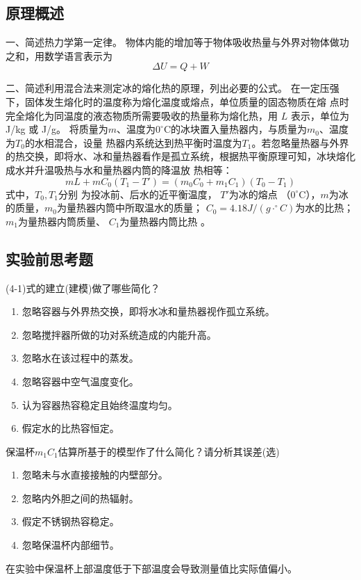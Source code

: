 \documentclass[dvipsnames, svgnames,a4paper,11pt]{article}
\begin{document}
\subsection{原理概述}
\begin{question}
	一、简述热力学第一定律。
\tcblower
物体内能的增加等于物体吸收热量与外界对物体做功之和，用数学语言表示为
$$\Delta U=Q+W$$
\end{question}
\begin{question}
	二、简述利用混合法来测定冰的熔化热的原理，列出必要的公式。
	\tcblower
	在一定压强下，固体发生熔化时的温度称为熔化温度或熔点，单位质量的固态物质在熔
点时完全熔化为同温度的液态物质所需要吸收的热量称为熔化热，用 $L$ 表示，单位为 J/kg
或 J/g。
将质量为$m$、温度为$0^\circ$C的冰块置入量热器内，与质量为$m_0$、温度为$T_0$的水相混合，设量
热器内系统达到热平衡时温度为$T_1$。若忽略量热器与外界的热交换，即将水、冰和量热器看作是孤立系统，根据热平衡原理可知，冰块熔化成水并升温吸热与水和量热器内筒的降温放
热相等：
$$mL+mC_0(T_1-T')=(m_0C_0+m_1C_1)(T_0-T_1) $$
式中，$T_0,T_1$分别 为投冰前、后水的近平衡温度，
$T'$为冰的熔点 （$0^\circ$C），$m$为冰的质量，$m_0$为量热器内筒中所取温水的质量；
$C_0=4.18J/(g\cdot^\circ C)$为水的比热； $m_1$为量热器内筒质量、 $C_1$为量热器内筒比热 。
\end{question}


\subsection{实验前思考题}
\begin{question}
	(4-1)式的建立(建模)做了哪些简化？
	\tcblower
	\begin{enumerate}
		\item 忽略容器与外界热交换，即将水冰和量热器视作孤立系统。
		\item 忽略搅拌器所做的功对系统造成的内能升高。
		\item 忽略水在该过程中的蒸发。
		\item 忽略容器中空气温度变化。
		\item 认为容器热容稳定且始终温度均匀。
		\item 假定水的比热容恒定。
	\end{enumerate}
\end{question}

\begin{question}
	保温杯$m_1C_1$估算所基于的模型作了什么简化？请分析其误差(选)
	\tcblower
	\begin{enumerate}
		\item 忽略未与水直接接触的内壁部分。
		\item 忽略内外胆之间的热辐射。
		\item 假定不锈钢热容稳定。
		\item 忽略保温杯内部细节。
	\end{enumerate}
	在实验中保温杯上部温度低于下部温度会导致测量值比实际值偏小。
\end{question}
\end{document}

